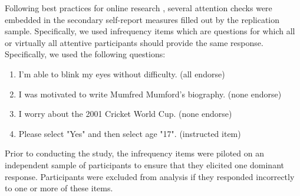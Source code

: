 \documentclass[letterpaper,man,natbib,floatsintext,longtable]{apa6}
\begin{document}
Following best practices for online research , several attention checks were embedded in the secondary self-report measures filled out by the replication sample. Specifically, we used infrequency items which are questions for which all  or virtually all attentive participants should provide the same response. Specifically, we used the following questions:

\begin{enumerate}
    \item I'm able to blink my eyes without difficulty. (all endorse)
    \item I was motivated to write Mumfred Mumford's biography. (none endorse)
    \item I worry about the 2001 Cricket World Cup. (none endorse)
    \item Please select "Yes" and then select age "17". (instructed item)
\end{enumerate}

\noindent Prior to conducting the study, the infrequency items were piloted on an independent sample of participants to ensure that they elicited one dominant response. Participants were excluded from analysis if they responded incorrectly to one or more of these items.

\end{document}
